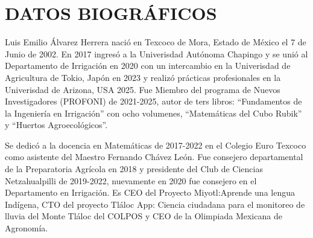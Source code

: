 

\chapter*{DATOS BIOGRÁFICOS}
Luis Emilio Álvarez Herrera nació en Texcoco de Mora, Estado de México el 7 de Junio de 2002. En 2017 ingresó a la Univerisdad Autónoma Chapingo y se unió al Departamento de Irrigación en 2020 con un intercambio en la Univerisdad de Agricultura de Tokio, Japón en 2023 y realizó prácticas profesionales en la Univerisdad de Arizona, USA 2025. Fue Miembro del programa de Nuevos Investigadores (PROFONI) de 2021-2025, autor de ters libros: ``Fundamentos de la Ingeniería en Irrigación'' con ocho volumenes, ``Matemáticas del Cubo Rubik'' y ``Huertos Agroecológicos''.

Se dedicó a la docencia en Matemáticas de 2017-2022 en el Colegio Euro Texcoco como asistente del Maestro Fernando Chávez León. Fue consejero departamental de la Preparatoria Agrícola en 2018 y presidente del Club de Ciencias Netzahualpilli de 2019-2022, nuevamente en 2020 fue consejero en el Departamento en Irrigación. Es CEO del Proyecto Miyotl:Aprende una lengua Indígena, CTO del proyecto Tláloc App: Ciencia ciudadana para el monitoreo de lluvia del Monte Tláloc del COLPOS y CEO de la Olimpiada Mexicana de Agronomía.




